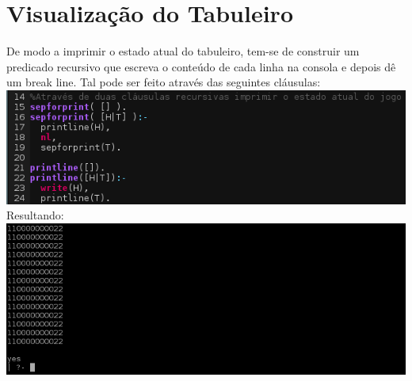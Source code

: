 \documentclass[a4paper]{article}
\begin{document}
\section{Visualização do Tabuleiro}
De modo a imprimir o estado atual do tabuleiro, tem-se de construir um predicado recursivo que escreva o conteúdo de cada linha na consola e depois dê um break line. Tal pode ser feito através das seguintes cláusulas:
\\\linebreak
\includegraphics[scale=0.77]{imprimir.png}
\\\linebreak
Resultando:
\includegraphics[scale=0.55]{tabuleiro.png}

\end{document}
